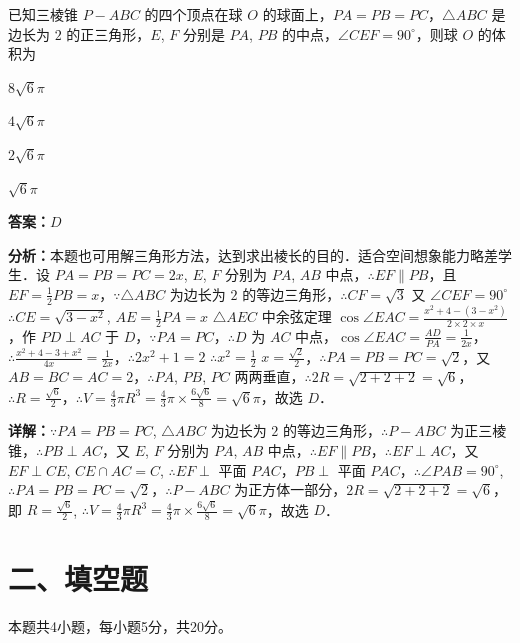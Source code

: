 \begin{question}[points=5]
已知三棱锥 $P-ABC$ 的四个顶点在球 $O$ 的球面上，$PA = PB = PC$，$\triangle ABC$ 是边长为 $2$ 的正三角形，$E$, $F$ 分别是 $PA$, $PB$ 的中点，$\angle CEF = 90^\circ$，则球 $O$ 的体积为
\begin{choices}
  \item $8\sqrt{6}\pi$
  \item $4\sqrt{6}\pi$
  \item $2\sqrt{6}\pi$
  \item $\sqrt{6}\pi$
\end{choices}
\begin{solution}
\textbf{答案：}$D$

\textbf{分析：}本题也可用解三角形方法，达到求出棱长的目的．适合空间想象能力略差学生．设 $PA = PB = PC = 2x$, $E$, $F$ 分别为 $PA$, $AB$ 中点，$\therefore EF \parallel PB$，且 $EF = \frac{1}{2}PB = x$，$\because \triangle ABC$ 为边长为 $2$ 的等边三角形，$\therefore CF = \sqrt{3}$ 又 $\angle CEF = 90^\circ$ $\therefore CE = \sqrt{3 - x^2}$, $AE = \frac{1}{2}PA = x$ $\triangle AEC$ 中余弦定理 $\cos \angle EAC = \frac{x^2 + 4 - (3 - x^2)}{2 \times 2 \times x}$，作 $PD \perp AC$ 于 $D$，$\because PA = PC$，$\therefore D$ 为 $AC$ 中点，$\cos \angle EAC = \frac{AD}{PA} = \frac{1}{2x}$，$\therefore \frac{x^2 + 4 - 3 + x^2}{4x} = \frac{1}{2x}$，$\therefore 2x^2 + 1 = 2$ $\therefore x^2 = \frac{1}{2}$ $x = \frac{\sqrt{2}}{2}$，$\therefore PA = PB = PC = \sqrt{2}$，又 $AB = BC = AC = 2$，$\therefore PA$, $PB$, $PC$ 两两垂直，$\therefore 2R = \sqrt{2 + 2 + 2} = \sqrt{6}$，$\therefore R = \frac{\sqrt{6}}{2}$，$\therefore V = \frac{4}{3}\pi R^3 = \frac{4}{3}\pi \times \frac{6\sqrt{6}}{8} = \sqrt{6}\pi$，故选 $D$．

\textbf{详解：}$\because PA = PB = PC$, $\triangle ABC$ 为边长为 $2$ 的等边三角形，$\therefore P-ABC$ 为正三棱锥，$\therefore PB \perp AC$，又 $E$, $F$ 分别为 $PA$, $AB$ 中点，$\therefore EF \parallel PB$，$\therefore EF \perp AC$，又 $EF \perp CE$, $CE \cap AC = C$, $\therefore EF \perp$ 平面 $PAC$，$PB \perp$ 平面 $PAC$，$\therefore \angle PAB = 90^\circ$, $\therefore PA = PB = PC = \sqrt{2}$，$\therefore P-ABC$ 为正方体一部分，$2R = \sqrt{2 + 2 + 2} = \sqrt{6}$，即 $R = \frac{\sqrt{6}}{2}$, $\therefore V = \frac{4}{3}\pi R^3 = \frac{4}{3}\pi \times \frac{6\sqrt{6}}{8} = \sqrt{6}\pi$，故选 $D$．
\end{solution}
\end{question}

\section*{二、填空题}
本题共4小题，每小题5分，共20分。

